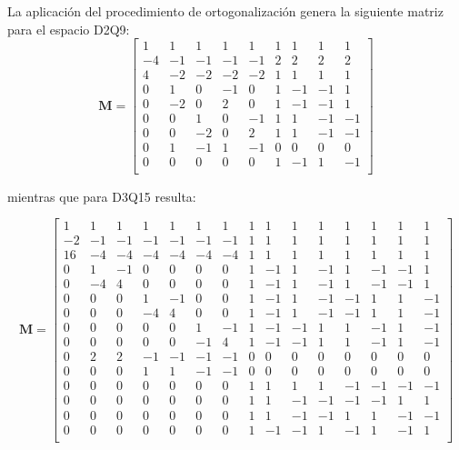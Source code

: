 La aplicaci\'on del procedimiento de ortogonalizaci\'on genera la siguiente matriz para el espacio D2Q9:
\begin{equation}
	\bm{M}=
	\begin{bmatrix}
	 1 &  1 &  1 &  1 &  1 & 1 &  1 &  1 &  1 \\
	-4 & -1 & -1 & -1 & -1 & 2 &  2 &  2 &  2 \\
	 4 & -2 & -2 & -2 & -2 & 1 &  1 &  1 &  1 \\
	 0 &  1 &  0 & -1 &  0 & 1 & -1 & -1 &  1 \\
	 0 & -2 &  0 &  2 &  0 & 1 & -1 & -1 &  1 \\
	 0 &  0 &  1 &  0 & -1 & 1 &  1 & -1 & -1 \\
	 0 &  0 & -2 &  0 &  2 & 1 &  1 & -1 & -1 \\
	 0 &  1 & -1 &  1 & -1 & 0 &  0 &  0 &  0 \\
	 0 &  0 &  0 &  0 &  0 & 1 & -1 &  1 & -1 \\
	\end{bmatrix}
	\label{eq:MRT_M_D2Q9}
\end{equation} 


mientras que para D3Q15 resulta:
\newpage

\setcounter{MaxMatrixCols}{15}
\begin{equation}
	\bm{M}=
	\begin{bmatrix}
	 1  &  1 &  1 &  1 &  1 & 1 &  1 &  1 &  1 & 1 & 1 & 1 & 1 & 1 & 1 \\
	 -2 & -1 & -1 & -1 & -1 & -1 & -1 & 1 & 1 & 1 & 1 & 1 & 1 & 1 & 1 \\
 	 16 & -4 & -4 & -4 & -4 & -4 & -4 & 1 & 1 & 1 & 1 & 1 & 1 & 1 & 1 \\
 	 0 & 1 & -1 & 0 & 0 & 0 & 0 & 1 & -1 & 1 & -1 & 1 & -1 & -1 & 1 \\
 	 0 & -4 & 4 & 0 & 0 & 0 & 0 & 1 & -1 & 1 & -1 & 1 & -1 & -1 & 1 \\
 	 0 & 0 & 0 & 1 & -1 & 0 & 0 & 1 & -1 & 1 & -1 & -1 & 1 & 1 & -1 \\
 	 0 & 0 & 0 & -4 & 4 & 0 & 0 & 1 & -1 & 1 & -1 & -1 & 1 & 1 & -1 \\
 	 0 & 0 & 0 & 0 & 0 & 1 & -1 & 1 & -1 & -1 & 1 & 1 & -1 & 1 & -1 \\
 	 0 & 0 & 0 & 0 & 0 & -1 & 4 & 1 & -1 & -1 & 1 & 1 & -1 & 1 & -1 \\
 	 0 & 2 & 2 & -1 & -1 & -1 & -1 & 0 & 0 & 0 & 0 & 0 & 0 & 0 & 0 \\
 	 0 & 0 & 0 & 1 & 1 & -1 & -1 & 0 & 0 & 0 & 0 & 0 & 0 & 0 & 0 \\
 	 0 & 0 & 0 & 0 & 0 & 0 & 0 & 1 & 1 & 1 & 1 & -1 & -1 & -1 & -1 \\
 	 0 & 0 & 0 & 0 & 0 & 0 & 0 & 1 & 1 & -1 & -1 & -1 & -1 & 1 & 1 \\
 	 0 & 0 & 0 & 0 & 0 & 0 & 0 & 1 & 1 & -1 & -1 & 1 & 1 & -1 & -1 \\
 	 0 & 0 & 0 & 0 & 0 & 0 & 0 & 1 & -1 & -1 & 1 & -1 & 1 & -1 & 1 \\
	\end{bmatrix}
	\label{eq:MRT_M_D3Q15}
\end{equation} 

